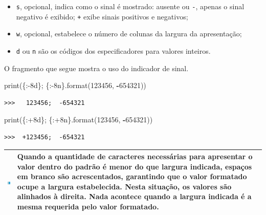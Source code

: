 \documentclass[
]{book}
\newenvironment{Shaded}{\begin{snugshade}}{\end{snugshade}}
\newcommand{\BuiltInTok}[1]{#1}
\newcommand{\DecValTok}[1]{\textcolor[rgb]{0.00,0.00,0.81}{#1}}
\newcommand{\NormalTok}[1]{#1}
\newcommand{\OperatorTok}[1]{\textcolor[rgb]{0.81,0.36,0.00}{\textbf{#1}}}
\newcommand{\SpecialCharTok}[1]{\textcolor[rgb]{0.00,0.00,0.00}{#1}}
\newcommand{\StringTok}[1]{\textcolor[rgb]{0.31,0.60,0.02}{#1}}
\providecommand{\tightlist}{%
  \setlength{\itemsep}{0pt}\setlength{\parskip}{0pt}}
\begin{document}
\begin{itemize}
\tightlist
\item
  \texttt{s}, opcional, indica como o sinal é mostrado: ausente ou \texttt{-}, apenas o sinal negativo é exibido; \texttt{+} exibe sinais positivos e negativos;
\item
  \texttt{w}, opcional, estabelece o número de colunas da largura da apresentação;
\item
  \texttt{d} ou \texttt{n} são os códigos dos especificadores para valores inteiros.
\end{itemize}

O fragmento que segue mostra o uso do indicador de sinal.

\begin{Shaded}
\begin{Highlighting}[]
\BuiltInTok{print}\NormalTok{(}\StringTok{\textquotesingle{}}\SpecialCharTok{\{:{-}8d\}}\StringTok{; }\SpecialCharTok{\{:{-}8n\}}\StringTok{\textquotesingle{}}\NormalTok{.}\BuiltInTok{format}\NormalTok{(}\DecValTok{123456}\NormalTok{, }\OperatorTok{{-}}\DecValTok{654321}\NormalTok{))}
\end{Highlighting}
\end{Shaded}

\begin{verbatim}
>>>   123456;  -654321
\end{verbatim}

\begin{Shaded}
\begin{Highlighting}[]
\BuiltInTok{print}\NormalTok{(}\StringTok{\textquotesingle{}}\SpecialCharTok{\{:+8d\}}\StringTok{; }\SpecialCharTok{\{:+8n\}}\StringTok{\textquotesingle{}}\NormalTok{.}\BuiltInTok{format}\NormalTok{(}\DecValTok{123456}\NormalTok{, }\OperatorTok{{-}}\DecValTok{654321}\NormalTok{))}
\end{Highlighting}
\end{Shaded}

\begin{verbatim}
>>>  +123456;  -654321
\end{verbatim}

\begin{longtable}[]{@{}
  >{\centering\arraybackslash}p{}
  >{\raggedright\arraybackslash}p{}@{}}
\toprule
\includegraphics{images/info.png} & Quando a quantidade de caracteres necessárias para apresentar o valor dentro do padrão é menor do que largura indicada, espaços em branco são acrescentados, garantindo que o valor formatado ocupe a largura estabelecida. Nesta situação, os valores são alinhados à direita. Nada acontece quando a largura indicada é a mesma requerida pelo valor formatado. \\
\midrule
\endhead
\bottomrule
\end{longtable}
\end{document}
